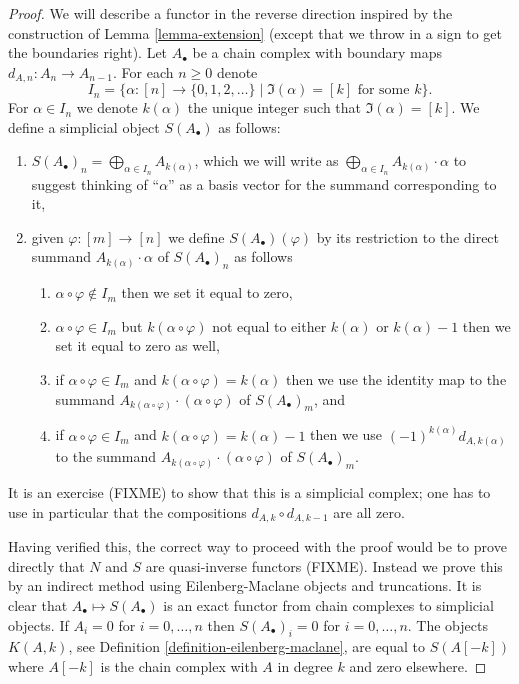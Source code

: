 \begin{proof}
We will describe a functor in the reverse direction
inspired by the construction of Lemma \ref{lemma-extension}
(except that we throw in a sign to get the boundaries
right). Let $A_\bullet$ be a chain complex with boundary maps
$d_{A, n} : A_n \to A_{n - 1}$. For each $n \geq 0$ denote
$$
I_n =
\Big\{
\alpha : [n] \to \{0, 1, 2, \ldots\}
\mid
\Im(\alpha) = [k]\text{ for some }k
\Big\}.
$$
For $\alpha \in I_n$ we denote $k(\alpha)$ the unique
integer such that $\Im(\alpha) = [k]$.
We define a simplicial object $S(A_\bullet)$ as follows:
\begin{enumerate}
\item $S(A_\bullet)_n = \bigoplus_{\alpha \in I_n} A_{k(\alpha)}$, which
we will write as
$\bigoplus_{\alpha \in I_n} A_{k(\alpha)} \cdot \alpha$
to suggest thinking of ``$\alpha$'' as a basis vector for the
summand corresponding to it,
\item given $\varphi : [m] \to [n]$ we define
$S(A_\bullet)(\varphi)$ by its restriction to
the direct summand $A_{k(\alpha)} \cdot \alpha$
of $S(A_\bullet)_n$ as follows
\begin{enumerate}
\item $\alpha \circ \varphi \not \in I_m$ then we set it equal to zero,
\item $\alpha \circ \varphi \in I_m$ but $k(\alpha \circ \varphi)$
not equal to either $k(\alpha)$ or $k(\alpha) - 1$ then we set it
equal to zero as well,
\item if $\alpha \circ \varphi \in I_m$
and $k(\alpha \circ \varphi) = k(\alpha)$ then we use
the identity map to the summand
$A_{k(\alpha \circ \varphi)} \cdot (\alpha \circ \varphi)$
of $S(A_\bullet)_m$, and
\item if $\alpha \circ \varphi \in I_m$
and $k(\alpha \circ \varphi) = k(\alpha) - 1$
then we use $(-1)^{k(\alpha)} d_{A, k(\alpha)}$ to the summand
$A_{k(\alpha \circ \varphi)}\cdot (\alpha \circ \varphi)$
of $S(A_\bullet)_m$.
\end{enumerate}
\end{enumerate}
It is an exercise (FIXME) to show that
this is a simplicial complex; one has to use in particular that
the compositions $d_{A, k} \circ d_{A, k - 1}$ are all zero.

\medskip\noindent
Having verified this, the correct way to proceed with the proof would be
to prove directly that $N$ and $S$ are quasi-inverse functors (FIXME).
Instead we prove this by an indirect method using Eilenberg-Maclane
objects and truncations. It is clear that $A_\bullet \mapsto
S(A_\bullet)$ is an exact functor from chain complexes
to simplicial objects. If $A_i = 0$ for $i = 0, \ldots, n$
then $S(A_\bullet)_i = 0$ for $i = 0, \ldots, n$.
The objects $K(A, k)$, see Definition \ref{definition-eilenberg-maclane},
are equal to $S(A[-k])$ where $A[-k]$ is the chain complex
with $A$ in degree $k$ and zero elsewhere.


\end{proof}
